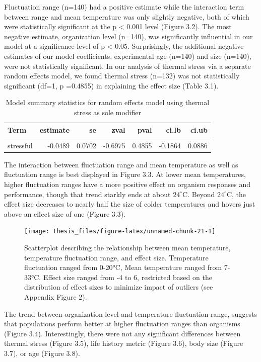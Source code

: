 \documentclass[12pt,twoside]{reedthesis}
\begin{document}
Fluctuation range (n=140) had a positive estimate while the interaction term between range and mean temperature was only slightly negative, both of which were statistically significant at the p \textless{} 0.001 level (Figure 3.2). The most negative estimate, organization level (n=140), was significantly influential in our model at a significance level of p \textless{} 0.05. Surprisingly, the additional negative estimates of our model coefficients, experimental age (n=140) and size (n=140), were not statistically significant. In our analysis of thermal stress via a separate random effects model, we found thermal stress (n=132) was not statistically significant (df=1, p =0.4855) in explaining the effect size (Table 3.1).
\begin{table}[!h]

\caption[Thermal stress model summary statistics]{\label{tab:unnamed-chunk-20}Model summary statistics for random effects model using thermal stress as sole modifier}
\centering
\begin{tabular}[t]{lrrrrrr}
\toprule
\textbf{Term} & \textbf{estimate} & \textbf{se} & \textbf{zval} & \textbf{pval} & \textbf{ci.lb} & \textbf{ci.ub}\\
\midrule
\cellcolor{gray!6}{intercept} & \cellcolor{gray!6}{0.2050} & \cellcolor{gray!6}{0.1846} & \cellcolor{gray!6}{1.1104} & \cellcolor{gray!6}{0.2668} & \cellcolor{gray!6}{-0.1568} & \cellcolor{gray!6}{0.5669}\\
stressful & -0.0489 & 0.0702 & -0.6975 & 0.4855 & -0.1864 & 0.0886\\
\bottomrule
\end{tabular}
\end{table}
\clearpage

The interaction between fluctuation range and mean temperature as well as fluctuation range is best displayed in Figure 3.3. At lower mean temperatures, higher fluctuation ranges have a more positive effect on organism responses and performance, though that trend starkly ends at about \(24^{\circ}\)C. Beyond \(24^{\circ}\)C, the effect size decreases to nearly half the size of colder temperatures and hovers just above an effect size of one (Figure 3.3).
\begin{figure}

{\centering \texttt{[image: thesis\_files/figure-latex/unnamed-chunk-21-1]} 

}

\caption[Scatterplot of relationship between range, mean, and effect size]{Scatterplot describing the relationship between mean temperature, temperature fluctuation range, and effect size. Temperature fluctuation ranged from 0-20°C, Mean temperature ranged from 7-33°C. Effect size ranged from -4 to 6, restricted based on the distribution of effect sizes to minimize impact of outliers (see Appendix Figure 2).}\label{fig:unnamed-chunk-21}
\end{figure}
The trend between organization level and temperature fluctuation range, suggests that populations perform better at higher fluctuation ranges than organisms (Figure 3.4). Interestingly, there were not any significant differences between thermal stress (Figure 3.5), life history metric (Figure 3.6), body size (Figure 3.7), or age (Figure 3.8).
\end{document}
